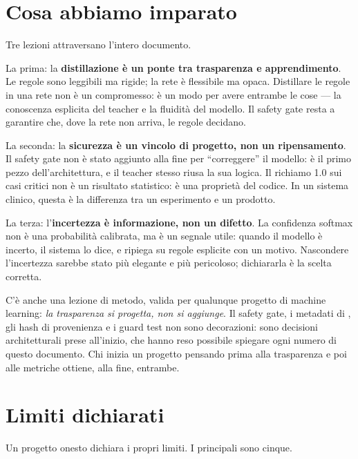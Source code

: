 \section{Cosa abbiamo imparato}\label{sec:cosa-imparato}

Tre lezioni attraversano l'intero documento.

La prima: la \textbf{distillazione è un ponte tra trasparenza e
apprendimento}. Le regole sono leggibili ma rigide; la rete è flessibile
ma opaca. Distillare le regole in una rete non è un compromesso: è un
modo per avere entrambe le cose — la conoscenza esplicita del teacher e la
fluidità del modello. Il safety gate resta a garantire che, dove la rete
non arriva, le regole decidano.

La seconda: la \textbf{sicurezza è un vincolo di progetto, non un
ripensamento}. Il safety gate non è stato aggiunto alla fine per
``correggere'' il modello: è il primo pezzo dell'architettura, e il
teacher stesso riusa la sua logica. Il richiamo 1.0 sui casi critici non è
un risultato statistico: è una proprietà del codice. In un sistema clinico,
questa è la differenza tra un esperimento e un prodotto.

La terza: l'\textbf{incertezza è informazione, non un difetto}. La
confidenza softmax non è una probabilità calibrata, ma è un segnale utile:
quando il modello è incerto, il sistema lo dice, e ripiega su regole
esplicite con un motivo. Nascondere l'incertezza sarebbe stato più
elegante e più pericoloso; dichiararla è la scelta corretta.

C'è anche una lezione di metodo, valida per qualunque progetto di machine
learning: \emph{la trasparenza si progetta, non si aggiunge}. Il safety
gate, i metadati di , gli hash di provenienza e i
guard test non sono decorazioni: sono decisioni architetturali prese
all'inizio, che hanno reso possibile spiegare ogni numero di questo
documento. Chi inizia un progetto pensando prima alla trasparenza e poi
alle metriche ottiene, alla fine, entrambe.

\section{Limiti dichiarati}\label{sec:limiti-dichiarati}

Un progetto onesto dichiara i propri limiti. I principali sono cinque.

